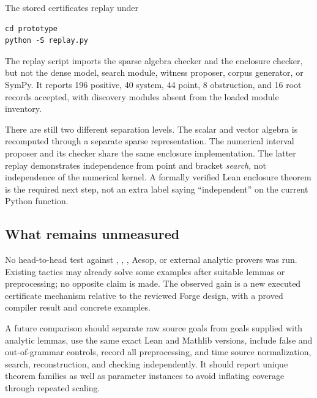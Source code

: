 The stored certificates replay under
\par\noindent\begin{minipage}{\textwidth}
\begin{lstlisting}
cd prototype
python -S replay.py
\end{lstlisting}
\end{minipage}\par
The replay script imports the sparse algebra checker and the enclosure checker, but not the dense model, search module, witness proposer, corpus generator, or SymPy. It reports 196 positive, 40 system, 44 point, 8 obstruction, and 16 root records accepted, with discovery modules absent from the loaded module inventory.

There are still two different separation levels. The scalar and vector algebra is recomputed through a separate sparse representation. The numerical interval proposer and its checker share the same enclosure implementation. The latter replay demonstrates independence from point and bracket \emph{search}, not independence of the numerical kernel. A formally verified Lean enclosure theorem is the required next step, not an extra label saying ``independent'' on the current Python function.

\subsection{What remains unmeasured}

No head-to-head test against , , , Aesop, or external analytic provers was run. Existing tactics may already solve some examples after suitable lemmas or preprocessing; no opposite claim is made. The observed gain is a new executed certificate mechanism relative to the reviewed Forge design, with a proved compiler result and concrete examples.

A future comparison should separate raw source goals from goals supplied with analytic lemmas, use the same exact Lean and Mathlib versions, include false and out-of-grammar controls, record all preprocessing, and time source normalization, search, reconstruction, and checking independently. It should report unique theorem families as well as parameter instances to avoid inflating coverage through repeated scaling.
